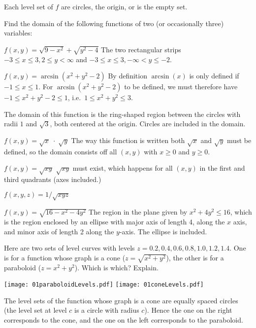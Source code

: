 Each level set of $f$ are circles, the origin, or is the empty set.


\endanswer


\problem Find the domain of the following functions of two (or occasionally%
three) variables:

\subprob  $f(x, y) = \sqrt{9-x^2}+\sqrt{y^2-4}$\hspace{5em}
\answer%
The two rectangular strips $-3\leq x\leq3, 2\leq y<\infty$ and
$-3\leq x\leq3, -\infty<y\leq-2$.
\endanswer

\subprob  $f(x, y) = \arcsin(x^2+y^2-2)$
\answer%
By definition $\arcsin(x)$ is only defined if $-1\leq x\leq1$.
For $\arcsin(x^2+y^2-2)$ to be defined, we must therefore have
$-1\leq x^2+y^2-2 \leq 1$, i.e.\ $1\leq x^2+y^2 \leq 3$.

The domain of this function is
the ring-shaped region between the circles with radii $1$ and
$\sqrt{3}$, both centered at the origin.
Circles are included in the domain.
\endanswer

\subprob  $f(x, y) = \sqrt{x}\;\cdot\;\sqrt{y}$
\answer%
The way this function is written both $\sqrt x$ and $\sqrt y$ must be defined,
so the domain consists off all $(x,y)$ with $x\geq0$ and $y\geq0$.
\endanswer

\subprob  $f(x, y) = \sqrt{xy}$
\answer%
$\sqrt{xy}$ must exist, which happens for all $(x,y)$ in the first
and third quadrants (axes included.)
\endanswer

\subprob  $f(x, y, z) = 1/\sqrt{xyz}$

\subprob  $f(x, y) = \sqrt{16-x^2-4y^2}$
\answer%
The region in the plane given by $x^2+4y^2\leq16$, which is the region
enclosed by an ellipse with
major axis of length 4, along the $x$ axis, and minor axis of length
2 along the $y$-axis.  The ellipse is included.
\endanswer

\problem\label{prb:cone-or-paraboloid}%
Here are two sets of level curves with levels $z=0.2, 0.4, 0.6, 0.8,
1.0, 1.2,  1.4$.  One is for a function whose graph is a cone
($z=\sqrt{x^2+y^2}$), the other is for a paraboloid ($z=x^2+y^2$).
Which is which? Explain.

\begin{center}
  \texttt{[image: 01paraboloidLevels.pdf]}
  \quad
  \texttt{[image: 01coneLevels.pdf]}
\end{center}
\answer%
The level sets of the function whose graph is a cone are equally spaced circles
(the level set at level $c$ is a circle with radius $c$).  Hence the one on the
right corresponds to the cone, and
the one on the left corresponds to the paraboloid.
\endanswer


